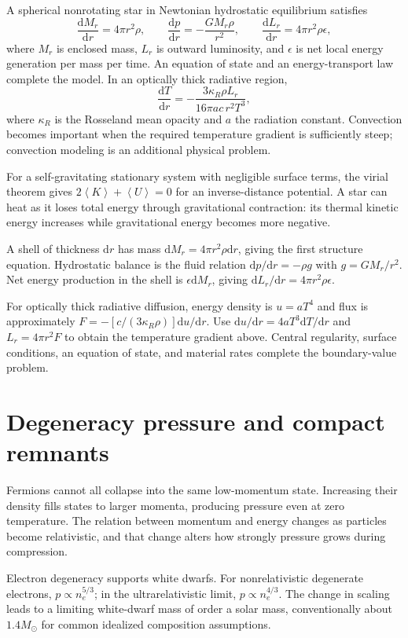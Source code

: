 \documentclass[11pt,oneside]{book}
\newcommand{\dd}{\mathrm{d}}
\newcommand{\avg}[1]{\left\langle #1\right\rangle}
\newcommand{\od}[2]{\frac{\dd #1}{\dd #2}}
\theoremstyle{reviewstyle}
\begin{document}
A spherical nonrotating star in Newtonian hydrostatic equilibrium satisfies
\begin{equation}\od{M_r}{r}=4\pi r^2\rho,\qquad \od{p}{r}=-\frac{GM_r\rho}{r^2},\qquad \od{L_r}{r}=4\pi r^2\rho\epsilon,\end{equation}
where $M_r$ is enclosed mass, $L_r$ is outward luminosity, and $\epsilon$ is net local energy generation per mass per time. An equation of state and an energy-transport law complete the model. In an optically thick radiative region,
\begin{equation}\od{T}{r}=-\frac{3\kappa_R\rho L_r}{16\pi ac\,r^2T^3},\end{equation}
where $\kappa_R$ is the Rosseland mean opacity and $a$ the radiation constant. Convection becomes important when the required temperature gradient is sufficiently steep; convection modeling is an additional physical problem.

For a self-gravitating stationary system with negligible surface terms, the virial theorem gives $2\avg K+\avg U=0$ for an inverse-distance potential. A star can heat as it loses total energy through gravitational contraction: its thermal kinetic energy increases while gravitational energy becomes more negative.

A shell of thickness $\dd r$ has mass $\dd M_r=4\pi r^2\rho\dd r$, giving the first structure equation. Hydrostatic balance is the fluid relation $\dd p/\dd r=-\rho g$ with $g=GM_r/r^2$. Net energy production in the shell is $\epsilon\dd M_r$, giving $\dd L_r/\dd r=4\pi r^2\rho\epsilon$.

For optically thick radiative diffusion, energy density is $u=aT^4$ and flux is approximately $F=-[c/(3\kappa_R\rho)]\dd u/\dd r$. Use $\dd u/\dd r=4aT^3\dd T/\dd r$ and $L_r=4\pi r^2F$ to obtain the temperature gradient above. Central regularity, surface conditions, an equation of state, and material rates complete the boundary-value problem.

\section{Degeneracy pressure and compact remnants}
Fermions cannot all collapse into the same low-momentum state. Increasing their density fills states to larger momenta, producing pressure even at zero temperature. The relation between momentum and energy changes as particles become relativistic, and that change alters how strongly pressure grows during compression.

Electron degeneracy supports white dwarfs. For nonrelativistic degenerate electrons, $p\propto n_e^{5/3}$; in the ultrarelativistic limit, $p\propto n_e^{4/3}$. The change in scaling leads to a limiting white-dwarf mass of order a solar mass, conventionally about $1.4M_\odot$ for common idealized composition assumptions.
\end{document}
